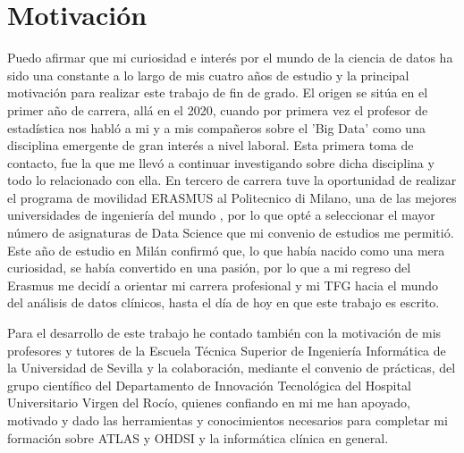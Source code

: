 
\section{Motivación} \label{sec:01Motivacion}



Puedo afirmar que mi curiosidad e interés por el mundo de la ciencia de datos ha sido una constante a lo largo de mis cuatro años de estudio y la principal motivación para realizar este trabajo de fin de grado. El origen se sitúa en el primer año de carrera, allá en el 2020, cuando por primera vez el profesor de estadística nos habló a mi y a mis compañeros sobre el 'Big Data' como una disciplina emergente de gran interés a nivel laboral. Esta primera toma de contacto, fue la que me llevó a continuar investigando sobre dicha disciplina y todo lo relacionado con ella. En tercero de carrera tuve la oportunidad de realizar el programa de movilidad ERASMUS al Politecnico di Milano, una de las mejores universidades de ingeniería del mundo \cite{QSPolimi}, por lo que opté a seleccionar el mayor número de asignaturas de Data Science que mi convenio de estudios me permitió. Este año de estudio en Milán confirmó que, lo que había nacido como una mera curiosidad, se había convertido en una pasión, por lo que a mi regreso del Erasmus me decidí a orientar mi carrera profesional y mi TFG hacia el mundo del análisis de datos clínicos, hasta el día de hoy en que este trabajo es escrito.

Para el desarrollo de este trabajo he contado también con la motivación de mis profesores y tutores de la Escuela Técnica Superior de Ingeniería Informática de la Universidad de Sevilla y la colaboración, mediante el convenio de prácticas, del grupo científico del Departamento de Innovación Tecnológica del Hospital Universitario Virgen del Rocío, quienes confiando en mi me han apoyado, motivado y dado las herramientas y conocimientos necesarios para completar mi formación sobre ATLAS y OHDSI y la informática clínica en general.
